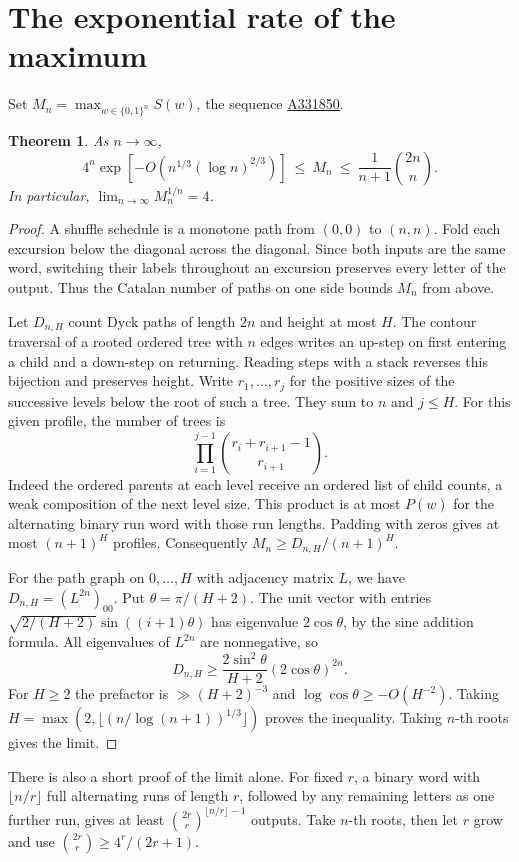 \documentclass[11pt,letterpaper]{article}
\newtheorem{theorem}{Theorem}
\newcommand{\oeis}[1]{\href{https://oeis.org/A#1}{A#1}}
\begin{document}
\section{The exponential rate of the maximum}
Set \(M_n=\max_{w\in\{0,1\}^n} S(w)\), the sequence \oeis{331850}.
\begin{theorem}
As \(n\to\infty\),
\[
 4^n\exp\!\left[-O\!\left(n^{1/3}(\log n)^{2/3}\right)\right]
 \ \le\ M_n\ \le\ \frac{1}{n+1}\binom{2n}{n}.
\]
In particular, \(\lim_{n\to\infty}M_n^{1/n}=4\).
\end{theorem}
\begin{proof}
A shuffle schedule is a monotone path from \((0,0)\) to \((n,n)\). Fold each excursion below the diagonal across the diagonal. Since both inputs are the same word, switching their labels throughout an excursion preserves every letter of the output. Thus the Catalan number of paths on one side bounds \(M_n\) from above.

Let \(D_{n,H}\) count Dyck paths of length \(2n\) and height at most \(H\). The contour traversal of a rooted ordered tree with \(n\) edges writes an up-step on first entering a child and a down-step on returning. Reading steps with a stack reverses this bijection and preserves height. Write \(r_1,\ldots,r_j\) for the positive sizes of the successive levels below the root of such a tree. They sum to \(n\) and \(j\le H\). For this given profile, the number of trees is
\[
 \prod_{i=1}^{j-1}\binom{r_i+r_{i+1}-1}{r_{i+1}}.
\]
Indeed the ordered parents at each level receive an ordered list of child counts, a weak composition of the next level size. This product is at most \(P(w)\) for the alternating binary run word with those run lengths. Padding with zeros gives at most \((n+1)^H\) profiles. Consequently \(M_n\ge D_{n,H}/(n+1)^H\).

For the path graph on \(0,\ldots,H\) with adjacency matrix \(L\), we have \(D_{n,H}=(L^{2n})_{00}\). Put \(\theta=\pi/(H+2)\). The unit vector with entries \(\sqrt{2/(H+2)}\sin((i+1)\theta)\) has eigenvalue \(2\cos\theta\), by the sine addition formula. All eigenvalues of \(L^{2n}\) are nonnegative, so
\[
 D_{n,H}\ge\frac{2\sin^2\theta}{H+2}(2\cos\theta)^{2n}.
\]
For \(H\ge2\) the prefactor is \(\gg(H+2)^{-3}\) and \(\log\cos\theta\ge -O(H^{-2})\). Taking \(H=\max(2,\lfloor(n/\log(n+1))^{1/3}\rfloor)\) proves the inequality. Taking \(n\)-th roots gives the limit.
\end{proof}

There is also a short proof of the limit alone. For fixed \(r\), a binary word with \(\lfloor n/r\rfloor\) full alternating runs of length \(r\), followed by any remaining letters as one further run, gives at least \(\binom{2r}{r}^{\lfloor n/r\rfloor-1}\) outputs. Take \(n\)-th roots, then let \(r\) grow and use \(\binom{2r}{r}\ge4^r/(2r+1)\).
\end{document}
